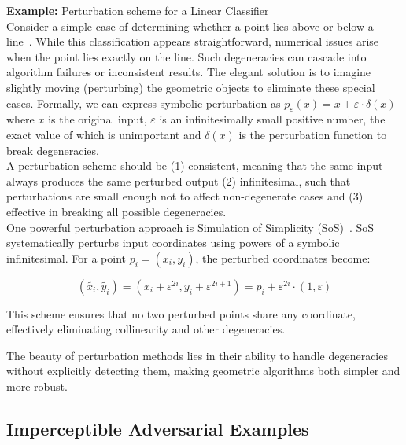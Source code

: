 \documentclass[a4paper, oneside]{discothesis}
\begin{document}
\begin{highlightbox}
	\textbf{Example:} Perturbation scheme for a Linear Classifier \\

	Consider a simple case of determining whether a point lies above or below a line~\cite{de2000computational}. While this classification appears straightforward, numerical issues arise when the point lies exactly on the line. Such degeneracies can cascade into algorithm failures or inconsistent results. The elegant solution is to imagine slightly moving (perturbing) the geometric objects to eliminate these special cases. Formally, we can express symbolic perturbation as $p_\varepsilon(x) = x + \varepsilon \cdot \delta(x)$ where $x$ is the original input, $\varepsilon$ is an infinitesimally small positive number, the exact value of which is unimportant and $\delta(x)$ is the perturbation function to break degeneracies. \\

	A perturbation scheme should be (1) consistent, meaning that the same input always produces the same perturbed output (2) infinitesimal, such that perturbations are small enough not to affect non-degenerate cases and (3) effective in breaking all possible degeneracies. \\

	One powerful perturbation approach is Simulation of Simplicity (SoS)~\cite{franklin2022implementing, edelsbrunner2002topological, edelsbrunner2001sink, edelsbrunner1990simulation, levy2016robustness, schorn1993axiomatic}. SoS systematically perturbs input coordinates using powers of a symbolic infinitesimal. For a point $p_i = (x_i, y_i)$, the perturbed coordinates become:

	$$(\tilde{x_i}, \tilde{y_i}) = (x_i + \varepsilon^{2i}, y_i + \varepsilon^{2i+1}) = p_i + \varepsilon^{2i} \cdot (1, \varepsilon)$$

	This scheme ensures that no two perturbed points share any coordinate, effectively eliminating collinearity and other degeneracies.
\end{highlightbox}

The beauty of perturbation methods lies in their ability to handle degeneracies without explicitly detecting them, making geometric algorithms both simpler and more robust.

\subsection{Imperceptible Adversarial Examples}
\end{document}
